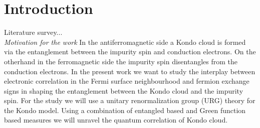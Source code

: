 \documentclass[aps,prx,preprint,groupedaddress]{revtex4-2}
\begin{document}
\section{Introduction}
\par\noindent
Literature survey...\\
\emph{Motivation for the work} In the antiferromagnetic side a Kondo cloud is formed via the entanglement between the impurity spin and conduction electrons. On the otherhand in the ferromagnetic side the impurity spin disentangles from the conduction electrons. In the present work we want to study the interplay between electronic correlation in the Fermi surface neighbourhood and fermion exchange
signs in shaping the entanglement between the Kondo cloud and the impurity spin.
For the study we will use a unitary renormalization group (URG) theory for the Kondo model. Using a combination of entangled based and Green function based measures we will unravel the quantum correlation of Kondo cloud.
\end{document}
